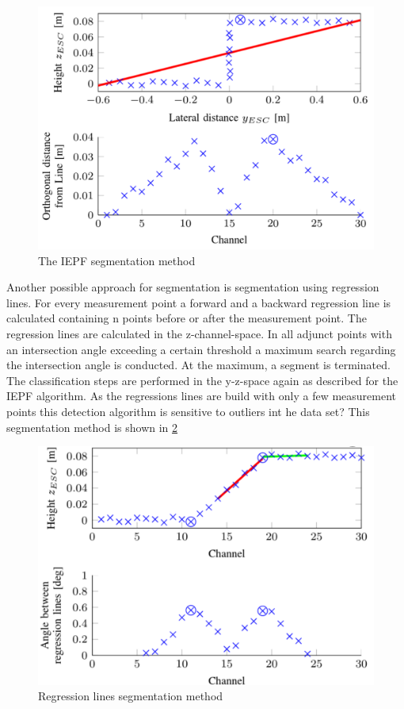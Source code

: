 \documentclass[conference]{IEEEtran}
\begin{document}
\begin{figure}[ht]
	\centering
   \includegraphics[scale = 0.35]{pictures/iepf.pdf}
	\caption{The IEPF segmentation method  \cite{lidar13}}
	\label{fig2}
\end{figure}
 

Another possible approach for segmentation is segmentation using regression lines. For every measurement point a forward and a backward regression line is calculated containing n points before or after the measurement point. The regression lines are calculated in the z-channel-space.  In all adjunct points with an intersection angle exceeding a certain threshold a maximum search regarding the intersection angle is conducted. At the maximum, a segment is terminated. The classification steps are performed in the y-z-space again as described for the IEPF algorithm. As the regressions lines are build with only a few measurement points this detection algorithm is sensitive to outliers int he data set? This segmentation method is shown in \ref{fig3}

\begin{figure}[H]
	\centering
  	\includegraphics[scale = 0.5]{pictures/iepf2.pdf}
	\caption{Regression lines segmentation method  \cite{lidar13}}
	\label{fig3}
\end{figure}
\end{document}
